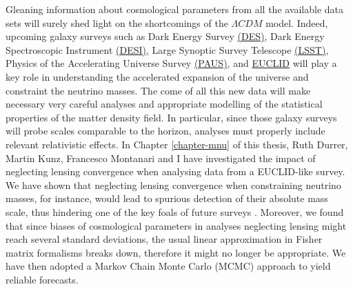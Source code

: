 Gleaning information about cosmological parameters from all the available data sets will surely shed light on the shortcomings of the $\Lambda CDM$ model. Indeed, upcoming galaxy surveys such as Dark Energy Survey \href{www.darkenergysurvey.org}{(DES)}, Dark Energy Spectroscopic Instrument \href{http://desi.lbl.gov/}{(DESI)}, Large Synoptic Survey Telescope \href{www.lsst.org}{(LSST)}, Physics of the Accelerating Universe Survey \href{www.pausurvey.org}{(PAUS)}, and \href{www.euclid-ec.org}{EUCLID} will play a key role in understanding the accelerated expansion of the universe and constraint the neutrino masses. The come of all this new data will make necessary very careful analyses and appropriate modelling of the statistical properties of the matter density field. In particular, since those galaxy surveys will probe scales comparable to the horizon, analyses must properly include relevant relativistic effects. In Chapter \ref{chapter-mnu} of this thesis, Ruth Durrer, Martin Kunz, Francesco Montanari and I have investigated the impact of neglecting lensing convergence when analysing data from a EUCLID-like survey. We have shown that neglecting lensing convergence when constraining neutrino masses, for instance, would lead to spurious detection of their absolute mass scale, thus hindering one of the key foals of future surveys \cite{Cardona:2016qxn}. Moreover, we found that since biases of cosmological parameters in analyses neglecting lensing might reach several standard deviations, the usual linear approximation in Fisher matrix formalisms breaks down,  therefore it might no longer be appropriate. We have then adopted a Markov Chain Monte Carlo (MCMC) approach to yield reliable forecasts.


